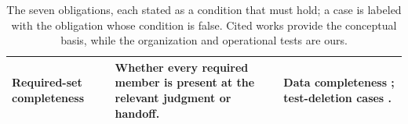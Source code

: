 \documentclass[letterpaper]{article} %
\begin{document}
\begin{table}[t]
\begin{tabular}{@{}p{}p{}p{}@{}}
Required-set completeness & Whether every required member is present at the relevant judgment or handoff. & Data completeness \citep{wang1996beyond}; test-deletion cases \citep{deshpande2026benchmarking}. \\

\bottomrule
\end{tabular}
\caption{The seven obligations, each stated as a condition that must hold; a case is labeled with the obligation whose condition is false. Cited works provide the conceptual basis, while the organization and operational tests are ours.}
\label{tab:obligation-families}
\end{table}



\end{document}
